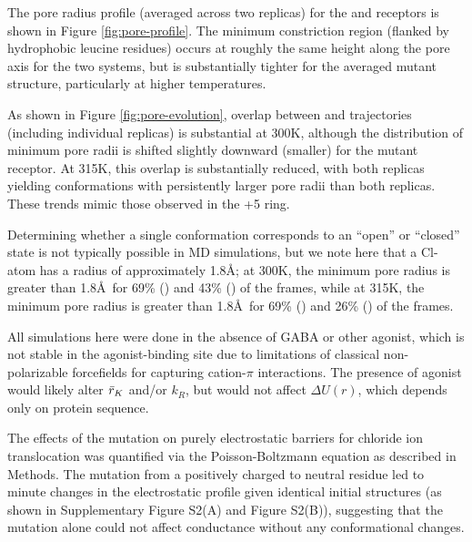 \documentclass[9pt,twocolumn,twoside,lineno]{pnas-new}
\begin{document}
The pore radius profile (averaged across two replicas) for the \MT and \WT receptors is shown in Figure \ref{fig:pore-profile}.  The minimum constriction region (flanked by hydrophobic leucine residues) occurs at roughly the same height along the pore axis for the two systems, but is substantially tighter for the averaged mutant structure, particularly at higher temperatures.

 As shown in Figure \ref{fig:pore-evolution}, overlap between \MT and \WT trajectories (including individual replicas) is substantial at 300K, although the distribution of minimum pore radii is shifted slightly downward (smaller) for the mutant receptor. At 315K, this overlap is substantially reduced, with both \WT replicas yielding conformations with persistently larger pore radii than both \MT replicas. These trends mimic those observed in the +5 ring.  
 
 
Determining whether a single conformation corresponds to an ``open'' or ``closed'' state is not typically possible in MD simulations, but we note here that a Cl- atom has a radius of approximately 1.8\AA; at 300K,  the minimum pore radius is greater than 1.8\AA\ for 69\% (\WT) and 43\% (\MT) of the frames, while at 315K, the minimum pore radius is greater than 1.8\AA\ for 69\% (\WT) and 26\% (\MT) of the frames.  

All simulations here were done in the absence of GABA or other agonist, which is not stable in the agonist-binding site due to limitations of classical non-polarizable forcefields for capturing cation-$\pi$ interactions.  The presence of agonist would likely alter $\bar{r}_{K}$ and/or $k_{R}$, but would not affect $\Delta U(r)$, which depends only on protein sequence.  

The effects of the mutation on purely electrostatic barriers for chloride ion translocation was quantified via the Poisson-Boltzmann equation as described in Methods.  The mutation from a positively charged to neutral residue led to minute changes in the electrostatic profile given identical initial structures (as shown in Supplementary Figure S2(A) and Figure S2(B)), suggesting that the mutation alone could not affect conductance without any conformational changes. 
\end{document}
